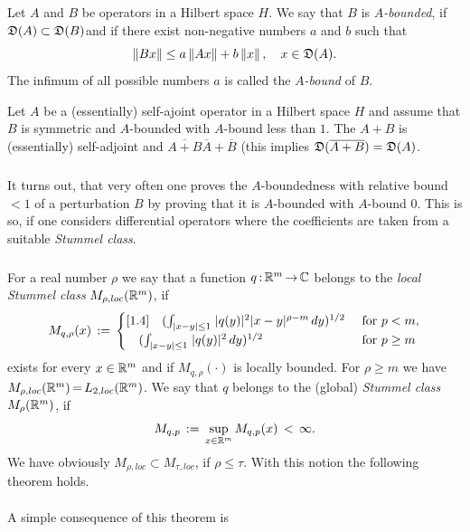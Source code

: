\documentclass[11pt,twoside]{article}
\begin{document}
\subparagraph*{}
Let $A$ and $B$ be operators in a Hilbert space $H$.
We say that $B$ is \textit{$A$-bounded},
if $\mathfrak{D}(A) \subset \mathfrak{D}(B)$and
if there exist non-negative numbers $a$ and $b$ such that
\[
\left\lVert Bx \right\rVert \leq a \left\lVert Ax \right\rVert + b\left\lVert x \right\rVert, \quad x \in \mathfrak{D}(A).
\]
The infimum of all possible numbers $a$ is called the \textit{$A$-bound} of $B$.

\begin{theorem}
Let $A$ be a (essentially) self-ajoint operator in a Hilbert space $H$
and assume that $B$ is symmetric and $A$-bounded with $A$-bound less than $1$.
The $A+B$ is (essentially) self-adjoint and
$\overline{A+B} \overline{A} + \overline{B}$
(this implies $\mathfrak{D}(\overline{A+B}) = \mathfrak{D}(A)$.
\end{theorem}

\subparagraph*{}
It turns out,
that very often one proves the $A$-boundedness with relative bound $<1$
of a perturbation $B$ by proving that it is $A$-bounded with $A$-bound $0$.
This is so,
if one considers differential operators where the coefficients are taken
from a suitable \textit{Stummel class}.

\subparagraph*{}
For a real number $\rho$ we say that a function $q {\,:\,}{\mathbb{R}}^m {\,\to\,} {\mathbb{C}}$ belongs to
the \textit{local Stummel class} $M_{\rho,loc}({\mathbb{R}}^m)$, if
\[
M_{q,\rho}(x) \eqdef
\begin{cases}[1.4]
\quad (\int_{\abs{x-y} \leq 1} \; \abs{q(y)} ^2 \abs{x-y} ^{\rho-m} \, dy)^{1/2}
& \for p < m,\\
\quad (\int_{\abs{x-y} \leq 1} \; \abs{q(y)} ^2 \, dy)^{1/2}
& \for p \geq m\\
\end{cases}
\]
exists for every $x \in {\mathbb{R}}^m$ and if $M_{q,\rho}(\cdot)$ is locally bounded.
For $\rho \geq m$ we have $M_{\rho,loc}({\mathbb{R}}^m) {\,=\,} L_{2,loc}({\mathbb{R}}^m)$.
We say that
$q$ belongs to the (global) \textit{Stummel class} $M_{\rho}({\mathbb{R}}^m)$,
if
\[
M_{q,p} \,:=\, \sup_{x \in {\mathbb{R}}^m} M_{q,p}(x) \, < \, \infty. 
\]
We have obviously $M_{\rho,loc} \subset M_{\tau,loc}$, if $\rho \leq \tau$.
With this notion the following theorem holds.


\paragraph*{}
A simple consequence of this theorem is


\end{document}

